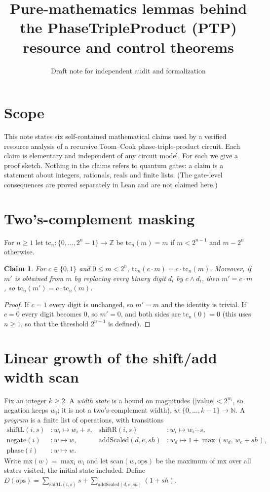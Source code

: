 \documentclass{article}
\title{Pure-mathematics lemmas behind the PhaseTripleProduct (PTP) resource and control theorems}
\author{Draft note for independent audit and formalization}
\date{}
\newtheorem{claim}{Claim}
\begin{document}
\maketitle

\section*{Scope}
This note states six self-contained mathematical claims used by a verified resource analysis of a
recursive Toom--Cook phase-triple-product circuit. Each claim is elementary and independent of any
circuit model. For each we give a proof sketch. Nothing in the claims refers to quantum gates: a claim is
a statement about integers, rationals, reals and finite lists. (The gate-level consequences are
proved separately in Lean and are not claimed here.)

\section{Two's-complement masking}
For $n\ge 1$ let $\mathrm{tc}_n:\{0,\dots,2^n-1\}\to\mathbb Z$ be
$\mathrm{tc}_n(m)=m$ if $m<2^{n-1}$ and $m-2^n$ otherwise.

\begin{claim}\label{c:mask}
For $c\in\{0,1\}$ and $0\le m<2^n$, $\mathrm{tc}_n(c\cdot m)=c\cdot \mathrm{tc}_n(m)$.
Moreover, if $m'$ is obtained from $m$ by replacing every binary digit $d_i$ by $c\wedge d_i$, then $m'=c\cdot m$, so $\mathrm{tc}_n(m')=c\cdot\mathrm{tc}_n(m)$.
\end{claim}
\begin{proof} If $c=1$ every digit is unchanged, so $m'=m$ and the identity is trivial. If $c=0$ every digit becomes $0$, so $m'=0$, and both sides are $\mathrm{tc}_n(0)=0$ (this uses $n\ge1$, so that the threshold $2^{n-1}$ is defined).\end{proof}

\section{Linear growth of the shift/add width scan}
Fix an integer $k\ge 2$. A \emph{width state} is a bound on magnitudes ($|\text{value}|<2^{w_i}$, so negation keeps $w_i$; it is not a two's-complement width), $w:\{0,\dots,k-1\}\to\mathbb N$. A \emph{program} is a finite list of
operations, with transitions
\begin{align*}
\mathrm{shiftL}(i,s)&: w_i \mapsto w_i+s, &
\mathrm{shiftR}(i,s)&: w_i\mapsto w_i\dot- s,\\
\mathrm{negate}(i)&: w\mapsto w, &
\mathrm{addScaled}(d,e,sh)&: w_d\mapsto 1+\max(w_d,\,w_e+sh),\\
\mathrm{phase}(i)&: w\mapsto w.
\end{align*}
Write $\mathrm{mx}(w)=\max_i w_i$ and let $\mathrm{scan}(w,\text{ops})$ be the maximum of $\mathrm{mx}$ over all
states visited, the initial state included. Define $D(\text{ops})=\sum_{\mathrm{shiftL}(i,s)}s+\sum_{\mathrm{addScaled}(d,e,sh)}(1+sh)$.
\end{document}

